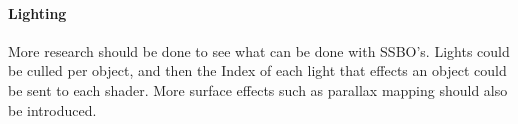 \documentclass[conference]{acmsiggraph}
\begin{document}
\paragraph{Lighting}
More research should be done to see what can be done with SSBO's. Lights could be culled per object, and then the Index of each light that effects an object could be sent to each shader. More surface effects such as parallax mapping should also be introduced.



\end{document}
